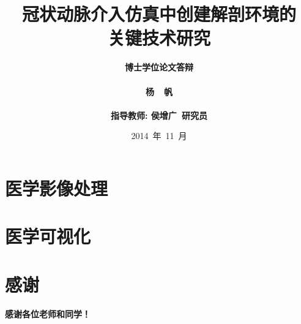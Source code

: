 \documentclass[10pt,compress,hyperref={unicode=true}]{beamer}
\begin{document}
\begin{CJK*}{UTF8}{hei}

\title[冠脉介入仿真中创建解剖环境的\\技术研究]{冠状动脉介入仿真中创建解剖环境的\\关键技术研究}%
\author[杨帆]{
\bf{博士学位论文答辩}\\
\small ~~\\
杨~~帆\\
\small ~~\\
指导教师: 侯增广~研究员\\
}
\date{\scriptsize 2014~年~11~月}


\begin{frame}
\titlepage
\end{frame}

\begin{frame}
\tableofcontents
\end{frame}

%

\section{医学影像处理}




\section{医学可视化}






\section*{感谢}
\begin{frame}
\centerline{\huge \bf{感谢各位老师和同学！}}
\end{frame}

\end{CJK*}
\end{document}
